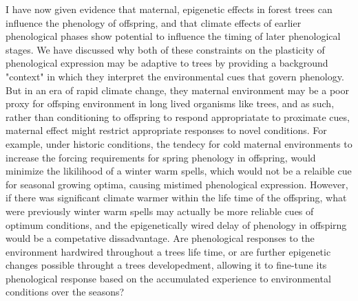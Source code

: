 \documentclass{article}\usepackage[]{graphicx}\usepackage[]{color}
\begin{document}
\par I have now given evidence that maternal, epigenetic effects in forest trees can influence the phenology of offspring, and that climate effects of earlier phenological phases show potential to influence the timing of later phenological stages. We have discussed why both of these constraints on the plasticity of phenological expression may be adaptive to trees by providing a background "context" in which they interpret the environmental cues that govern phenology. But in an era of rapid climate change, they maternal environment may be a poor proxy for offsping environment  in long lived organisms like trees, and as such, rather than conditioning to offspring to respond appropriatate to proximate cues, maternal effect might restrict appropriate responses to novel conditions. For example, under historic conditions, the tendecy for cold maternal environments to increase the forcing requirements for spring phenology in offspring, would minimize the likilihood of a winter warm spells, which would not be a relaible cue for seasonal growing optima, causing mistimed phenological expression. However, if there was significant climate warmer within the life time of the offspring, what were previously winter warm spells may actually be more reliable cues of optimum conditions, and the epigenetically wired delay of phenology in offspirng would be a competative dissadvantage. Are phenological responses to the environment hardwired throughout a trees life time, or are further epigenetic changes possible throught a trees developedment, allowing it to fine-tune its phenological response based on the accumulated experience to environmental conditions over the seasons?  
\end{document}
